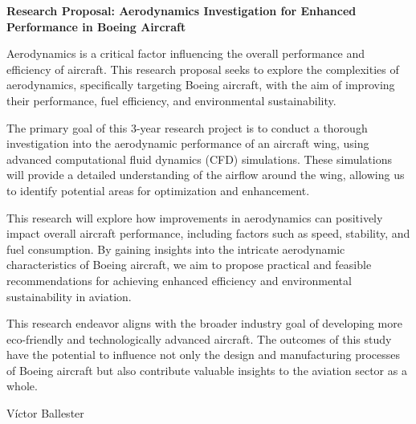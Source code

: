\documentclass{letter}
\date{\today}
\begin{document}
\begin{letter}
  \hfill

  \textbf{Research Proposal: Aerodynamics Investigation for Enhanced Performance in Boeing Aircraft}

  Aerodynamics is a critical factor influencing the overall performance and efficiency of aircraft. This research proposal seeks to explore the complexities of aerodynamics, specifically targeting Boeing aircraft, with the  aim of improving their performance, fuel efficiency, and environmental sustainability.

  The primary goal of this 3-year research project is to conduct a thorough investigation into the aerodynamic performance of an aircraft wing, using advanced computational fluid dynamics (CFD) simulations. These simulations will provide a detailed understanding of the airflow around the wing, allowing us to identify potential areas for optimization and enhancement.

  This research will explore how improvements in aerodynamics can positively impact overall aircraft performance, including factors such as speed, stability, and fuel consumption. By gaining insights into the intricate aerodynamic characteristics of Boeing aircraft, we aim to propose practical and feasible recommendations for achieving enhanced efficiency and environmental sustainability in aviation.

  This research endeavor aligns with the broader industry goal of developing more eco-friendly and technologically advanced aircraft. The outcomes of this study have the potential to influence not only the design and manufacturing processes of Boeing aircraft but also contribute valuable insights to the aviation sector as a whole.

  \bigskip

  Víctor Ballester
\end{letter}
\end{document}
